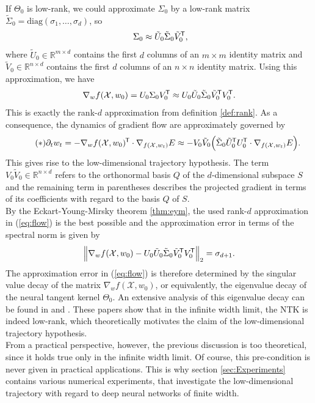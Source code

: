\documentclass[11pt, a4paper]{article}
\newcommand{\R}{\mathbb{R}}
\newcommand{\X}{\mathcal{X}}
\newcommand*{\tr}{^{\mkern-1.5mu\mathsf{T}}}
\begin{document}
If $\Theta_0$ is low-rank, we could approximate $\Sigma_0$ by a low-rank matrix $\tilde{\Sigma}_0 = \text{diag}(\sigma_1, \dots, \sigma_d)$, so
\[ \Sigma_0 \approx \tilde{U}_0 \tilde{\Sigma}_0 \tilde{V}_0\tr , \]
where $\tilde{U}_0 \in \R^{m \times d}$ contains the first $d$ columns of an $m \times m$ identity matrix and $\tilde{V}_0 \in \R^{n \times d}$ contains the first $d$ columns of an $n \times n$ identity matrix. Using this approximation, we have
\[ \nabla_wf(\X,w_0) = U_0 \Sigma_0 V_0\tr \approx U_0 \tilde{U}_0 \tilde{\Sigma}_0 \tilde{V}_0\tr  V_0\tr . \]
This is exactly the rank-$d$ approximation from definition \ref{def:rank}. As a consequence, the dynamics of gradient flow are approximately governed by
\begin{equation} \label{eq:flow} \tag{$\ast$}
\partial_t w_t = -\nabla_wf(\X,w_0)\tr  \cdot \nabla_{f(\X,w_t)} E \approx - V_0 \tilde{V}_0 \Big ( \tilde{\Sigma}_0 \tilde{U}_0\tr  U_0\tr  \cdot \nabla_{f(\X,w_t)} E \Big ).
\end{equation}
This gives rise to the low-dimensional trajectory hypothesis. The term $V_0\tilde{V}_0 \in \R^{n \times d}$ refers to the orthonormal basis $Q$ of the $d$-dimensional subspace $S$ and the remaining term in parentheses describes the projected gradient in terms of its coefficients with regard to the basis $Q$ of $S$. \\

By the Eckart-Young-Mirsky theorem \ref{thm:eym}, the used rank-$d$ approximation in (\ref{eq:flow}) is the best possible and the approximation error in terms of the spectral norm is given by
\[ \Big \| \nabla_wf(\X,w_0) - U_0 \tilde{U}_0 \tilde{\Sigma}_0 \tilde{V}_0\tr  V_0\tr \Big \|_2 = \sigma_{d+1}. \] 
The approximation error in (\ref{eq:flow}) is therefore determined by the singular value decay of the matrix $\nabla_wf(\X,w_0)$, or equivalently, the eigenvalue decay of the neural tangent kernel $\Theta_0$. An extensive analysis of this eigenvalue decay can be found in \cite{Decay1} and \cite{Decay2}. These papers show that in the infinite width limit, the NTK is indeed low-rank, which theoretically motivates the claim of the low-dimensional trajectory hypothesis. \\

From a practical perspective, however, the previous discussion is too theoretical, since it holds true only in the infinite width limit. Of course, this pre-condition is never given in practical applications. This is why section \ref{sec:Experiments} contains various numerical experiments, that investigate the low-dimensional trajectory with regard to deep neural networks of finite width.
\end{document}
